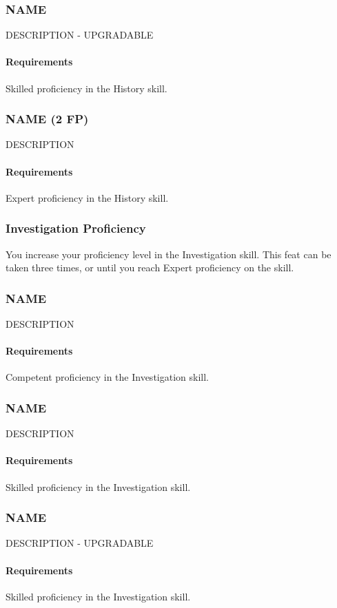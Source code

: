 \subsubsection{NAME} \label{feat::name}
    DESCRIPTION - UPGRADABLE
    \paragraph{Requirements} Skilled proficiency in the History skill.
\subsubsection{NAME (2 FP)} \label{feat::name}
    DESCRIPTION
    \paragraph{Requirements} Expert proficiency in the History skill.
\subsubsection{Investigation Proficiency} \label{feat::investigationprof}
    You increase your proficiency level in the Investigation skill.
    This feat can be taken three times, or until you reach Expert proficiency on the skill.
\subsubsection{NAME} \label{feat::name}
    DESCRIPTION
    \paragraph{Requirements} Competent proficiency in the Investigation skill.
\subsubsection{NAME} \label{feat::name}
    DESCRIPTION
    \paragraph{Requirements} Skilled proficiency in the Investigation skill.
\subsubsection{NAME} \label{feat::name}
    DESCRIPTION - UPGRADABLE
    \paragraph{Requirements} Skilled proficiency in the Investigation skill.
